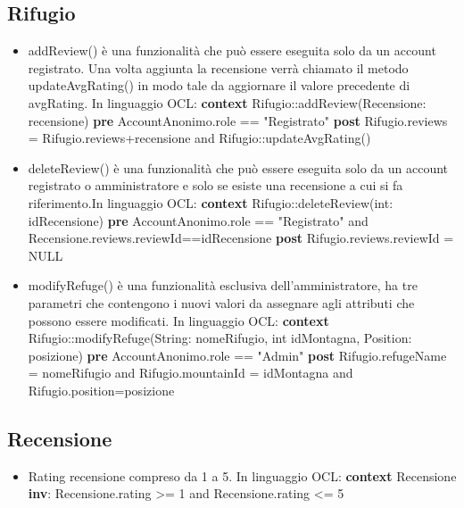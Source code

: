 \documentclass[a4paper,12pt]{article}
\begin{document}
\subsection{Rifugio}
\begin{itemize}
    \item addReview() è una funzionalità che può essere eseguita solo da un account registrato. Una volta aggiunta la recensione verrà chiamato il metodo updateAvgRating() in modo tale da aggiornare il valore precedente di avgRating. \newline \newline In linguaggio OCL:\newline
    \textbf{context} Rifugio::addReview(Recensione: recensione) \newline 
    \textbf{pre} AccountAnonimo.role == "Registrato"\newline
    \textbf{post} Rifugio.reviews = Rifugio.reviews+recensione and Rifugio::updateAvgRating() 
    \item deleteReview() è una funzionalità che può essere eseguita solo da un account registrato o amministratore e solo se esiste una recensione a cui si fa riferimento.\newline \newline In linguaggio OCL:\newline
    \textbf{context} Rifugio::deleteReview(int: idRecensione) \newline
    \textbf{pre} AccountAnonimo.role == "Registrato" \newline 
    and Recensione.reviews.reviewId==idRecensione \newline
    \textbf{post} Rifugio.reviews.reviewId = NULL  
    \item modifyRefuge() è una funzionalità esclusiva dell'amministratore, ha tre parametri che contengono i nuovi valori da assegnare agli attributi che possono essere modificati. \newline \newline In linguaggio OCL:\newline
    \textbf{context} Rifugio::modifyRefuge(String: nomeRifugio, int idMontagna, Position: posizione) \newline
    \textbf{pre} AccountAnonimo.role == "Admin" \newline
    \textbf{post} Rifugio.refugeName = nomeRifugio and Rifugio.mountainId = idMontagna and Rifugio.position=posizione 
\end{itemize}


\subsection{Recensione}
\begin{itemize}
    \item Rating recensione compreso da 1 a 5. \newline \newline In linguaggio OCL:\newline
    \textbf{context} Recensione \textbf{inv}: Recensione.rating >= 1 and Recensione.rating <= 5
     
\end{itemize}
\end{document}
